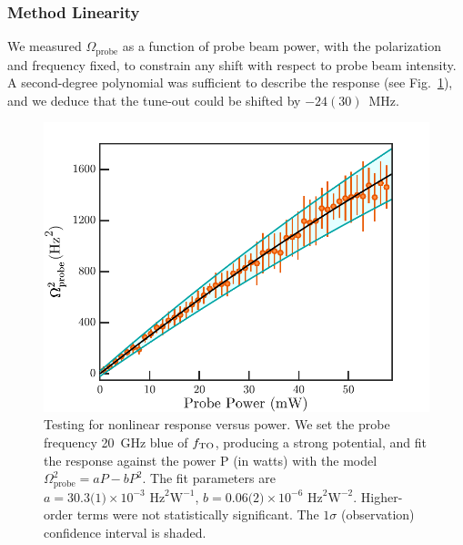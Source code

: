 \subsubsection{Method Linearity}
	
	We measured \(\Omega_{\mathrm{probe}}\) as a function of probe beam power, with the polarization and frequency fixed, to constrain any shift with respect to probe beam intensity. A second-degree polynomial was sufficient to describe the  response (see Fig.~\ref{fig:probe_beam_linearity}), and we deduce that the tune-out could be shifted by \(-24(30)\)~MHz.

		\begin{figure}
	    \begin{minipage}{0.6\textwidth}
	    \vspace{0pt}
	    \includegraphics[width=\textwidth]{fig/tuneout/probe_beam_linearity}
	    \end{minipage}
	    \hfill
	    \begin{minipage}{0.4\textwidth}
	    \vspace{0pt}
	    \caption{Testing for nonlinear response versus power. We set the  probe frequency 20~GHz blue of $f_\mathrm{TO}$,  producing a strong potential, and fit the response against the power P (in watts) with the model \( \Omega_{\mathrm{probe}}^2 = a  P - b P^2 \).  The fit parameters are \(a=\text{30.3(1)}\times 10^{-3}\text{~Hz}^2\text{W}^{-1}\), \(b= \text{0.06(2)} \times 10^{-6}\text{~Hz}^2\text{W}^{-2}\). Higher-order terms  were not statistically significant. The \(1\sigma\) (observation) confidence interval is shaded. 	    }
	    \label{fig:probe_beam_linearity}
	    \end{minipage}
	\end{figure}



